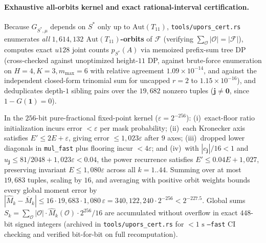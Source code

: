 \documentclass[11pt,a4paper]{article}
\theoremstyle{definition}
\theoremstyle{remark}
\newcommand{\calF}{\mathcal{F}}
\begin{document}
\paragraph{Exhaustive all-orbits kernel and exact rational-interval certification.}
Because $G_{S^*,\mu}$ depends on $S^*$ only up to $\mathrm{Aut}(T_{11})$, \texttt{tools/upors\_\allowbreak cert.rs} enumerates \emph{all} \textbf{$1{,}614{,}132$ $\mathrm{Aut}(T_{11})$-orbits} of $\calF$ (verifying $\sum_{\mathcal{O}} |\mathcal{O}| = |\calF|$), computes exact $u128$ joint counts $p_{S^*}(A)$ via memoized prefix-sum tree DP (cross-checked against unoptimized height-$11$ DP, against brute-force enumeration on $H = 4, K = 3, m_{\max} = 6$ with relative agreement $1.09 \times 10^{-14}$, and against the independent closed-form trinomial sum for uncapped $r = 2$ to $1.15 \times 10^{-16}$), and deduplicates depth-$1$ sibling pairs over the $19{,}682$ nonzero tuples ($\mathbf{j} \neq \mathbf{0}$, since $1 - G(\mathbf{1}) = 0$).

In the $256$-bit pure-fractional fixed-point kernel ($\varepsilon = 2^{-256}$): (i)~exact-floor ratio initialization incurs error $< \varepsilon$ per mask probability; (ii)~each Kronecker axis satisfies $E' \le 2E + \varepsilon$, giving error $\le 1{,}023\varepsilon$ after $9$ axes; (iii)~dropped lower diagonals in \texttt{mul\_fast} plus flooring incur $< 4\varepsilon$; and (iv)~with $|c_{\mathbf{j}}|/16 < 1$ and $\widehat{u}_{\mathbf{j}} \le 81/2048 + 1{,}023\varepsilon < 0.04$, the power recurrence satisfies $E' \le 0.04 E + 1{,}027$, preserving invariant $E \le 1{,}080\varepsilon$ across all $k = 1..44$. Summing over at most $19{,}683$ tuples, scaling by $16$, and averaging with positive orbit weights bounds every global moment error by $|\widehat{M}_k - \overline{M}_k| \le 16 \cdot 19{,}683 \cdot 1{,}080\,\varepsilon = 340{,}122{,}240 \cdot 2^{-256} < 2^{-227.5}$. Global sums $S_k = \sum_{\mathcal{O}} |\mathcal{O}| \cdot \widehat{M}_k(\mathcal{O}) \cdot 2^{256}/16$ are accumulated without overflow in exact $448$-bit signed integers (archived in \texttt{tools/upors\_cert.rs} for $< 1\text{ s}$ \texttt{--fast} CI checking and verified bit-for-bit on full recomputation).
\end{document}
